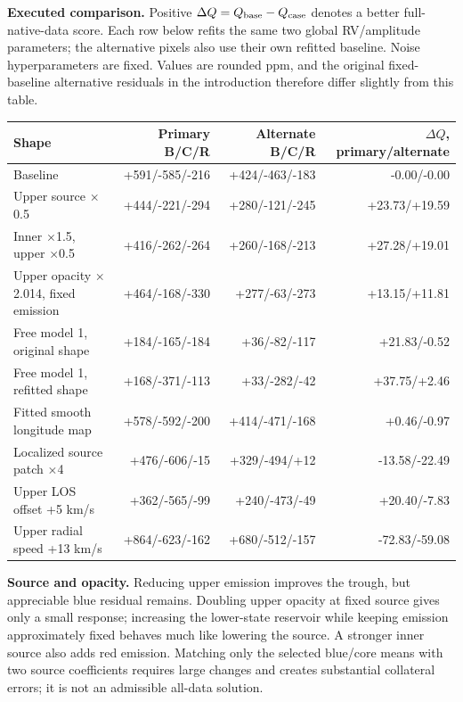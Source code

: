 \textbf{Executed comparison.} Positive $\Delta Q=Q_{\rm base}-Q_{\rm case}$ denotes a better full-native-data score. Each row below refits the same two global RV/amplitude parameters; the alternative pixels also use their own refitted baseline. Noise hyperparameters are fixed. Values are rounded ppm, and the original fixed-baseline alternative residuals in the introduction therefore differ slightly from this table.

\begin{center}\small\begin{tabular}{lrrr}\toprule

Shape & Primary B/C/R & Alternate B/C/R & $\Delta Q$, primary/alternate\\\midrule

Baseline & +591/-585/-216 & +424/-463/-183 & -0.00/-0.00\\

Upper source $\times$0.5 & +444/-221/-294 & +280/-121/-245 & +23.73/+19.59\\

Inner $\times$1.5, upper $\times$0.5 & +416/-262/-264 & +260/-168/-213 & +27.28/+19.01\\

Upper opacity $\times$2.014, fixed emission & +464/-168/-330 & +277/-63/-273 & +13.15/+11.81\\

Free model 1, original shape & +184/-165/-184 & +36/-82/-117 & +21.83/-0.52\\

Free model 1, refitted shape & +168/-371/-113 & +33/-282/-42 & +37.75/+2.46\\

Fitted smooth longitude map & +578/-592/-200 & +414/-471/-168 & +0.46/-0.97\\

Localized source patch $\times$4 & +476/-606/-15 & +329/-494/+12 & -13.58/-22.49\\

Upper LOS offset +5 km/s & +362/-565/-99 & +240/-473/-49 & +20.40/-7.83\\

Upper radial speed +13 km/s & +864/-623/-162 & +680/-512/-157 & -72.83/-59.08\\

\bottomrule\end{tabular}\end{center}

\textbf{Source and opacity.} Reducing upper emission improves the trough, but appreciable blue residual remains. Doubling upper opacity at fixed source gives only a small response; increasing the lower-state reservoir while keeping emission approximately fixed behaves much like lowering the source. A stronger inner source also adds red emission. Matching only the selected blue/core means with two source coefficients requires large changes and creates substantial collateral errors; it is not an admissible all-data solution.

